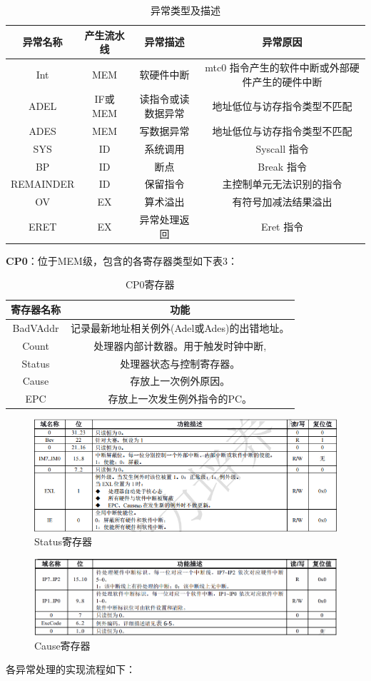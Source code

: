 \begin{table}
\centering
\begin{tabular}{|c|c|c|c|} \hline 
	异常名称&  产生流水线&  异常描述& 异常原因\\ \hline 
	Int&  MEM&  软硬件中断&  mtc0 指令产生的软件中断或外部硬件产生的硬件中断\\ \hline 
	ADEL&  IF或MEM&  读指令或读数据异常& 地址低位与访存指令类型不匹配\\ \hline 
	ADES&  MEM&  写数据异常& 地址低位与访存指令类型不匹配\\ \hline 
	SYS&  ID&  系统调用& Syscall 指令\\ \hline 
	BP&  ID&  断点& Break 指令\\ \hline 
	REMAINDER&  ID&  保留指令& 主控制单元无法识别的指令\\ \hline 
	OV&  EX&  算术溢出& 有符号加减法结果溢出\\ \hline
	ERET& EX& 异常处理返回&Eret 指令\\\hline
\end{tabular}
\caption{异常类型及描述}
\label{tab:my_label}
\end{table}

\textbf{CP0}：位于MEM级，包含的各寄存器类型如下表3：


\begin{table}
\centering
\begin{tabular}{|c|c|} \hline 
	寄存器名称& 功能\\ \hline 
	BadVAddr& 记录最新地址相关例外(Adel或Ades)的出错地址。\\ \hline 
	Count& 处理器内部计数器。用于触发时钟中断,\\ \hline 
	Status& 处理器状态与控制寄存器。\\ \hline 
	Cause& 存放上一次例外原因。\\ \hline
	EPC&存放上一次发生例外指令的PC。\\\hline
\end{tabular}
\caption{CP0寄存器}
\label{tab:my_label}
\end{table}

\begin{figure}
\centering
\includegraphics[width=0.5\linewidth]{image/P6.png}
\caption{Status寄存器}
\label{fig:enter-label}
\end{figure}
\begin{figure}
\centering
\includegraphics[width=0.5\linewidth]{image/P7.png}
\caption{Cause寄存器}
\label{fig:enter-label}
\end{figure}
各异常处理的实现流程如下：


